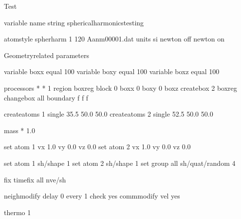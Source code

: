 \documentclass[letterpaper,10pt,english]{sphinxmanual}
\begin{document}
\begin{sphinxVerbatim}[commandchars=\\\{\}]
\PYGZsh{} Test

variable    name string spherical\PYGZus{}harmonics\PYGZus{}testing

atom\PYGZus{}style  spherharm 1     120 A\PYGZhy{}anm\PYGZhy{}00001.dat
units               si
newton off
\PYGZsh{} newton on

\PYGZsh{}\PYGZsh{}\PYGZsh{}\PYGZsh{}\PYGZsh{}\PYGZsh{}\PYGZsh{}\PYGZsh{}\PYGZsh{}\PYGZsh{}\PYGZsh{}\PYGZsh{}\PYGZsh{}\PYGZsh{}\PYGZsh{}\PYGZsh{}\PYGZsh{}\PYGZsh{}\PYGZsh{}\PYGZsh{}\PYGZsh{}\PYGZsh{}\PYGZsh{}\PYGZsh{}\PYGZsh{}\PYGZsh{}\PYGZsh{}\PYGZsh{}\PYGZsh{}\PYGZsh{}\PYGZsh{}\PYGZsh{}\PYGZsh{}\PYGZsh{}\PYGZsh{}\PYGZsh{}\PYGZsh{}\PYGZsh{}\PYGZsh{}\PYGZsh{}\PYGZsh{}\PYGZsh{}\PYGZsh{}\PYGZsh{}\PYGZsh{}\PYGZsh{}\PYGZsh{}
\PYGZsh{} Geometry\PYGZhy{}related parameters
\PYGZsh{}\PYGZsh{}\PYGZsh{}\PYGZsh{}\PYGZsh{}\PYGZsh{}\PYGZsh{}\PYGZsh{}\PYGZsh{}\PYGZsh{}\PYGZsh{}\PYGZsh{}\PYGZsh{}\PYGZsh{}\PYGZsh{}\PYGZsh{}\PYGZsh{}\PYGZsh{}\PYGZsh{}\PYGZsh{}\PYGZsh{}\PYGZsh{}\PYGZsh{}\PYGZsh{}\PYGZsh{}\PYGZsh{}\PYGZsh{}\PYGZsh{}\PYGZsh{}\PYGZsh{}\PYGZsh{}\PYGZsh{}\PYGZsh{}\PYGZsh{}\PYGZsh{}\PYGZsh{}\PYGZsh{}\PYGZsh{}\PYGZsh{}\PYGZsh{}\PYGZsh{}\PYGZsh{}\PYGZsh{}\PYGZsh{}\PYGZsh{}\PYGZsh{}\PYGZsh{}

variable    boxx equal 100
variable    boxy equal 100
variable    boxz equal 100


\PYGZsh{}\PYGZsh{}\PYGZsh{}\PYGZsh{}\PYGZsh{}\PYGZsh{}\PYGZsh{}\PYGZsh{}\PYGZsh{}\PYGZsh{}\PYGZsh{}\PYGZsh{}\PYGZsh{}
processors * * 1
region              boxreg block 0 \PYGZdl{}\PYGZob{}boxx\PYGZcb{} 0 \PYGZdl{}\PYGZob{}boxy\PYGZcb{} 0 \PYGZdl{}\PYGZob{}boxz\PYGZcb{}
create\PYGZus{}box  2 boxreg
change\PYGZus{}box  all boundary f f f

create\PYGZus{}atoms        1 single 35.5 50.0 50.0
create\PYGZus{}atoms        2 single 52.5 50.0 50.0

\PYGZsh{}mass *      1.0

set                 atom 1 vx 1.0 vy 0.0 vz 0.0
set                 atom 2 vx \PYGZhy{}1.0 vy 0.0 vz 0.0

set         atom 1 sh/shape 1
set         atom 2 sh/shape 1
set         group all sh/quat/random 4

fix         time\PYGZus{}fix all nve/sh

neigh\PYGZus{}modify        delay 0 every 1 check yes
comm\PYGZus{}modify vel yes

thermo 1


\end{sphinxVerbatim}
\end{document}
